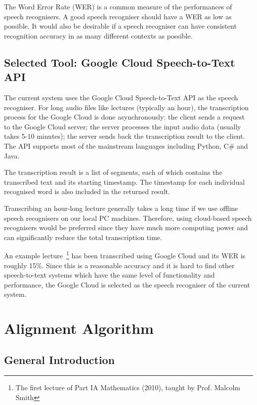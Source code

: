 The Word Error Rate (WER) is a common measure of the performances of speech recognisers. A good speech recogniser should have a WER as low as possible. It would also be desirable if a speech recogniser can have consistent recognition accuracy in as many different contexts as possible.

\subsection{Selected Tool: Google Cloud Speech-to-Text API}

The current system uses the Google Cloud Speech-to-Text API as the speech recogniser. For long audio files like lectures (typically an hour), the transcription process for the Google Cloud is done asynchronously: the client sends a request to the Google Cloud server; the server processes the input audio data (usually takes 5-10 minutes); the server sends back the transcription result to the client. The API supports most of the mainstream languages including Python, C\# and Java.

The transcription result is a list of segments, each of which contains the transcribed text and its starting timestamp. The timestamp for each individual recognised word is also included in the returned result.

Transcribing an hour-long lecture generally takes a long time if we use offline speech recognisers on our local PC machines. Therefore, using cloud-based speech recognisers would be preferred since they have much more computing power and can significantly reduce the total transcription time. 

An example lecture~\footnote{The first lecture of Part IA Mathematics (2010), taught by Prof. Malcolm Smith} has been transcribed using Google Cloud and its WER is roughly 15\%. Since this is a reasonable accuracy and it is hard to find other speech-to-text systems which have the same level of functionality and performance, the Google Cloud is selected as the speech recogniser of the current system.


\section{Alignment Algorithm}

\subsection{General Introduction}

